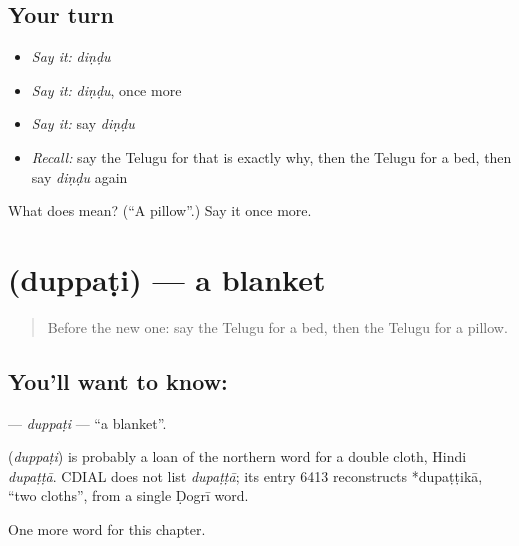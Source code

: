 \subsection*{Your turn}
\begin{itemize}
\raggedright
  \item \emph{Say it:} \emph{diṇḍu}
  \item \emph{Say it:} \emph{diṇḍu}, once more
  \item \emph{Say it:} say \emph{diṇḍu}
  \item \emph{Recall:} say the Telugu for that is exactly why, then the Telugu for a bed, then say \emph{diṇḍu} again
\end{itemize}

\begin{tcolorbox}[breakable,colback=teal!4,colframe=teal!35!black,title={Before you move on}]
What does  mean? (\textquotedblleft{}A pillow\textquotedblright{}.) Say it once more.
\end{tcolorbox}
\section[\texorpdfstring{\te{దుప్పటి} (duppaṭi)}{దుప్పటి (duppaṭi)}]{ (duppaṭi) — a blanket}

\label{lesson:TE-C109-duppati}



\begin{quote}
Before the new one: say the Telugu for a bed, then the Telugu for a pillow.
\end{quote}

\subsection*{You'll want to know: }
\textbf{} — \emph{duppaṭi} — \textquotedblleft{}a blanket\textquotedblright{}.

\begin{cousinweb}
\textbf{} (\emph{duppaṭi}) is probably a loan of the northern word for a double cloth, Hindi \emph{dupaṭṭā}. CDIAL does not list \emph{dupaṭṭā}; its entry 6413 reconstructs *dupaṭṭikā, \textquotedblleft{}two cloths\textquotedblright{}, from a single Ḍogrī word.
\end{cousinweb}

\begin{grammarlens}[title={What you've built}]
One more word for this chapter.
\end{grammarlens}


